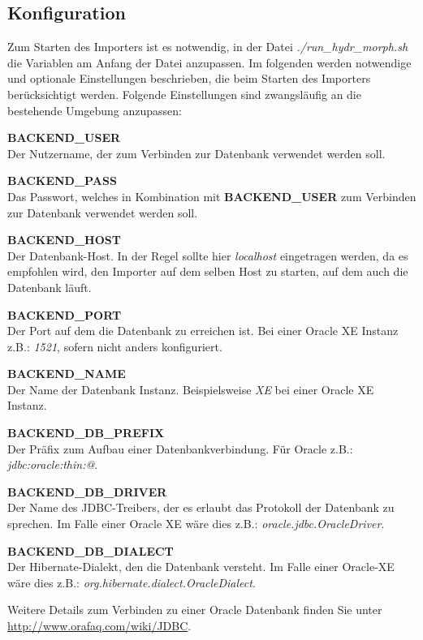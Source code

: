 \subsection{Konfiguration}
\label{configuration}
Zum Starten des Importers ist es notwendig, in der Datei
\textit{./run\_hydr\_morph.sh} die Variablen am Anfang der Datei
anzupassen. Im folgenden werden notwendige und optionale Einstellungen
beschrieben, die beim Starten des Importers berücksichtigt werden. Folgende
Einstellungen sind zwangsläufig an die bestehende Umgebung anzupassen:

\textbf{BACKEND\_USER}
\\Der Nutzername, der zum Verbinden zur Datenbank verwendet werden soll.

\textbf{BACKEND\_PASS}
\\Das Passwort, welches in Kombination mit \textbf{BACKEND\_USER} zum Verbinden
zur Datenbank verwendet werden soll.

\textbf{BACKEND\_HOST}
\\Der Datenbank-Host. In der Regel sollte hier \textit{localhost} eingetragen
werden, da es empfohlen wird, den Importer auf dem selben Host zu starten, auf
dem auch die Datenbank läuft.

\textbf{BACKEND\_PORT}
\\Der Port auf dem die Datenbank zu erreichen ist. Bei einer Oracle XE Instanz
z.B.: \textit{1521}, sofern nicht anders konfiguriert.

\textbf{BACKEND\_NAME}
\\Der Name der Datenbank Instanz. Beispielsweise \textit{XE} bei einer Oracle XE
Instanz.

\textbf{BACKEND\_DB\_PREFIX}
\\Der Präfix zum Aufbau einer Datenbankverbindung. Für Oracle z.B.: \textit{jdbc:oracle:thin:@}.

\textbf{BACKEND\_DB\_DRIVER}
\\Der Name des JDBC-Treibers, der es erlaubt das Protokoll der Datenbank zu
sprechen. Im Falle einer Oracle XE wäre dies z.B.: \textit{oracle.jdbc.OracleDriver}.

\textbf{BACKEND\_DB\_DIALECT}
\\Der Hibernate-Dialekt, den die Datenbank versteht. Im Falle einer Oracle-XE
wäre dies z.B.: \textit{org.hibernate.dialect.OracleDialect}.


Weitere Details zum Verbinden zu einer Oracle Datenbank finden Sie unter\\
\href{http://www.orafaq.com/wiki/JDBC}{http://www.orafaq.com/wiki/JDBC}.


